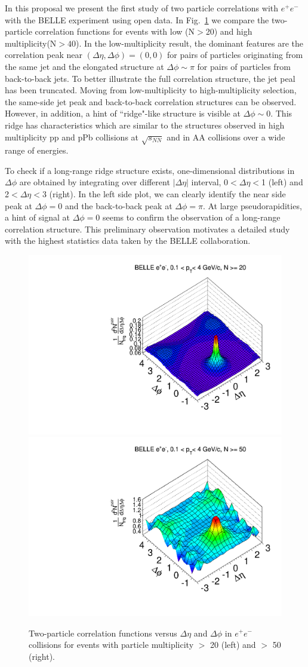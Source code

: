 In this proposal we present the first study of two particle correlations with $e^{+}e^{-}$ with the BELLE experiment using open data.
In Fig.~\ref{fig:ridgeBelle} we compare the two-particle correlation functions for events with low (N$>$20) and high multiplicity(N$>40$). 
In the low-multiplicity result, the dominant features are the correlation peak near $(\Delta\eta,\Delta\phi)=(0,0)$ for pairs of particles originating from the same jet 
and the elongated structure at $\Delta\phi\sim\pi$ for pairs of particles from back-to-back jets. To better illustrate the full correlation structure, the jet peal has been truncated.
Moving from low-multiplicity to high-multiplicity selection, the same-side jet peak and back-to-back correlation structures can be observed. 
However, in addition, a hint of ``ridge"-like structure is visible at $\Delta\phi \sim$0. This ridge has characteristics which are similar to the structures
observed in high multiplicity pp and pPb collisions at $\sqrt{s_{NN}}$ and in AA collisions over a wide range of energies.

To check if a long-range ridge structure exists, one-dimensional distributions in $\Delta\phi$ are obtained by integrating over different $|\Delta\eta|$ interval, 0$<\Delta \eta<$1 (left) and 
2$<\Delta \eta<$3 (right). In the left side plot, we can clearly identify the near side peak at $\Delta\phi=$0 and the back-to-back peak at $\Delta\phi=\pi$. At large pseudorapidities, 
a hint of signal at $\Delta\phi=0$ seems to confirm the observation of a long-range correlation structure. This preliminary observation motivates a detailed study with the highest 
statistics data taken by the BELLE collaboration. 

\begin{figure}[!htb]
\begin{center}
\includegraphics[width=.45\textwidth]{figures/canvasRidgeBelleMult20CutHigh0.pdf}
\includegraphics[width=.45\textwidth]{figures/canvasRidgeBelleMult50CutHigh0.pdf}
\caption{Two-particle correlation functions versus $\Delta\eta$ and $\Delta\phi$ in $e^{+}e^{-}$ collisions for events with particle multiplicity $>$ 20 (left) and  $>$ 50 (right).}
\label{fig:ridgeBelle} 
\end{center}
\end{figure}

